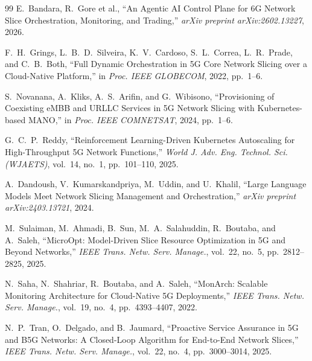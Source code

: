 \documentclass[12pt]{article}
\begin{document}
\begin{thebibliography}{99}
E.~Bandara, R.~Gore et al., ``An Agentic AI Control Plane for 6G Network
Slice Orchestration, Monitoring, and Trading,'' \textit{arXiv preprint
arXiv:2602.13227}, 2026.

F.~H.~Grings, L.~B.~D.~Silveira, K.~V.~Cardoso, S.~L.~Correa,
L.~R.~Prade, and C.~B.~Both, ``Full Dynamic Orchestration in 5G Core
Network Slicing over a Cloud-Native Platform,'' in \textit{Proc. IEEE
GLOBECOM}, 2022, pp.~1--6.

S.~Novanana, A.~Kliks, A.~S.~Arifin, and G.~Wibisono, ``Provisioning
of Coexisting eMBB and URLLC Services in 5G Network Slicing with
Kubernetes-based MANO,'' in \textit{Proc. IEEE COMNETSAT}, 2024,
pp.~1--6.

G.~C.~P.~Reddy, ``Reinforcement Learning-Driven Kubernetes Autoscaling
for High-Throughput 5G Network Functions,'' \textit{World J. Adv. Eng.
Technol. Sci. (WJAETS)}, vol.~14, no.~1, pp.~101--110, 2025.

A.~Dandoush, V.~Kumarskandpriya, M.~Uddin, and U.~Khalil, ``Large
Language Models Meet Network Slicing Management and Orchestration,''
\textit{arXiv preprint arXiv:2403.13721}, 2024.

M.~Sulaiman, M.~Ahmadi, B.~Sun, M.~A.~Salahuddin, R.~Boutaba, and
A.~Saleh, ``MicroOpt: Model-Driven Slice Resource Optimization in 5G and
Beyond Networks,'' \textit{IEEE Trans. Netw. Serv. Manage.}, vol.~22,
no.~5, pp.~2812--2825, 2025.

N.~Saha, N.~Shahriar, R.~Boutaba, and A.~Saleh, ``MonArch: Scalable
Monitoring Architecture for Cloud-Native 5G Deployments,'' \textit{IEEE
Trans. Netw. Serv. Manage.}, vol.~19, no.~4, pp.~4393--4407, 2022.

N.~P.~Tran, O.~Delgado, and B.~Jaumard, ``Proactive Service Assurance
in 5G and B5G Networks: A Closed-Loop Algorithm for End-to-End Network
Slices,'' \textit{IEEE Trans. Netw. Serv. Manage.}, vol.~22, no.~4,
pp.~3000--3014, 2025.

\end{thebibliography}
\end{document}
